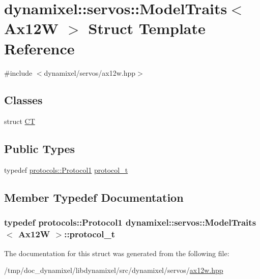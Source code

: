 \hypertarget{structdynamixel_1_1servos_1_1_model_traits_3_01_ax12_w_01_4}{}\section{dynamixel\+:\+:servos\+:\+:Model\+Traits$<$ Ax12\+W $>$ Struct Template Reference}
\label{structdynamixel_1_1servos_1_1_model_traits_3_01_ax12_w_01_4}


{\ttfamily \#include $<$dynamixel/servos/ax12w.\+hpp$>$}

\subsection*{Classes}
\begin{DoxyCompactItemize}
\item 
struct \hyperlink{structdynamixel_1_1servos_1_1_model_traits_3_01_ax12_w_01_4_1_1_c_t}{C\+T}
\end{DoxyCompactItemize}
\subsection*{Public Types}
\begin{DoxyCompactItemize}
\item 
typedef \hyperlink{classdynamixel_1_1protocols_1_1_protocol1}{protocols\+::\+Protocol1} \hyperlink{structdynamixel_1_1servos_1_1_model_traits_3_01_ax12_w_01_4_ab1df14eb0d6ea5088102d324f7464591}{protocol\+\_\+t}
\end{DoxyCompactItemize}


\subsection{Member Typedef Documentation}
\hypertarget{structdynamixel_1_1servos_1_1_model_traits_3_01_ax12_w_01_4_ab1df14eb0d6ea5088102d324f7464591}{}
\subsubsection[{protocol\+\_\+t}]{\setlength{\rightskip}{0pt plus 5cm}typedef {\bf protocols\+::\+Protocol1} {\bf dynamixel\+::servos\+::\+Model\+Traits}$<$ {\bf Ax12\+W} $>$\+::{\bf protocol\+\_\+t}}\label{structdynamixel_1_1servos_1_1_model_traits_3_01_ax12_w_01_4_ab1df14eb0d6ea5088102d324f7464591}


The documentation for this struct was generated from the following file\+:\begin{DoxyCompactItemize}
\item 
/tmp/doc\+\_\+dynamixel/libdynamixel/src/dynamixel/servos/\hyperlink{ax12w_8hpp}{ax12w.\+hpp}\end{DoxyCompactItemize}
